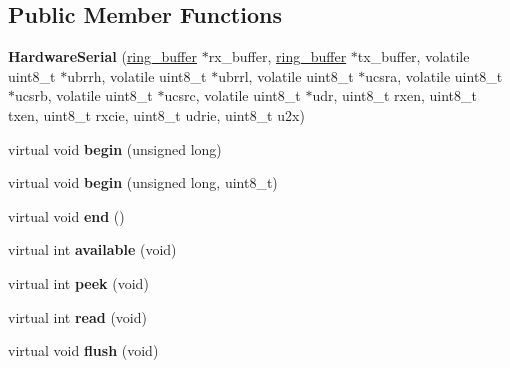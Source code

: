 \subsection*{Public Member Functions}
\begin{DoxyCompactItemize}
\item 
\hypertarget{class_hardware_serial_a3f8623cacdc470b5415c9aaca8bb443d}{}{\bfseries Hardware\+Serial} (\hyperlink{structring__buffer}{ring\+\_\+buffer} $\ast$rx\+\_\+buffer, \hyperlink{structring__buffer}{ring\+\_\+buffer} $\ast$tx\+\_\+buffer, volatile uint8\+\_\+t $\ast$ubrrh, volatile uint8\+\_\+t $\ast$ubrrl, volatile uint8\+\_\+t $\ast$ucsra, volatile uint8\+\_\+t $\ast$ucsrb, volatile uint8\+\_\+t $\ast$ucsrc, volatile uint8\+\_\+t $\ast$udr, uint8\+\_\+t rxen, uint8\+\_\+t txen, uint8\+\_\+t rxcie, uint8\+\_\+t udrie, uint8\+\_\+t u2x)\label{class_hardware_serial_a3f8623cacdc470b5415c9aaca8bb443d}

\item 
\hypertarget{class_hardware_serial_afdc8fcd58c5ec464e85340e4ffeca77f}{}virtual void {\bfseries begin} (unsigned long)\label{class_hardware_serial_afdc8fcd58c5ec464e85340e4ffeca77f}

\item 
\hypertarget{class_hardware_serial_a41455cb70205d750a26b39f2f8c6a855}{}virtual void {\bfseries begin} (unsigned long, uint8\+\_\+t)\label{class_hardware_serial_a41455cb70205d750a26b39f2f8c6a855}

\item 
\hypertarget{class_hardware_serial_a5e1d31504f418250340f628bd8eb60eb}{}virtual void {\bfseries end} ()\label{class_hardware_serial_a5e1d31504f418250340f628bd8eb60eb}

\item 
\hypertarget{class_hardware_serial_a60e2bb4a3f40cfaf94601cd4e3333f43}{}virtual int {\bfseries available} (void)\label{class_hardware_serial_a60e2bb4a3f40cfaf94601cd4e3333f43}

\item 
\hypertarget{class_hardware_serial_a69b3cfa7d35cc8102fe14e302034f194}{}virtual int {\bfseries peek} (void)\label{class_hardware_serial_a69b3cfa7d35cc8102fe14e302034f194}

\item 
\hypertarget{class_hardware_serial_a760f254188b4687f5a8a74f4ddd3c83d}{}virtual int {\bfseries read} (void)\label{class_hardware_serial_a760f254188b4687f5a8a74f4ddd3c83d}

\item 
\hypertarget{class_hardware_serial_a33a5d5c5ffa184e2c303a21152fa2abe}{}virtual void {\bfseries flush} (void)\label{class_hardware_serial_a33a5d5c5ffa184e2c303a21152fa2abe}


\end{DoxyCompactItemize}
